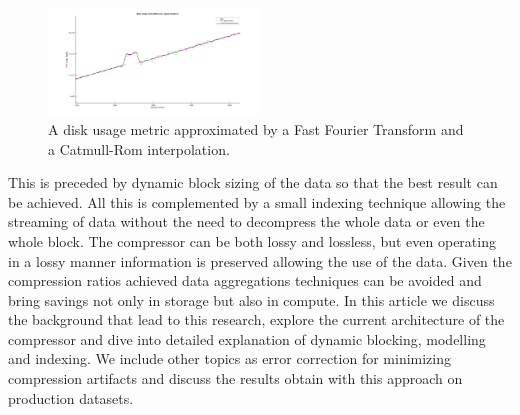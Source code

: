 \documentclass[conference]{IEEEtran}
\begin{document}
\begin{figure}[ht]
  \centering
  \includegraphics[width=0.5\textwidth]{math_approximation-2.png}
  \caption{A disk usage metric approximated by a Fast Fourier Transform and a Catmull-Rom interpolation.}
  \label{math_aprox}
\end{figure}

This is preceded by dynamic block sizing of the data so that the best result can be achieved.
All this is complemented by a small indexing technique allowing the streaming of data without the need to decompress the whole data or even the whole block.
The compressor can be both lossy and lossless, but even operating in a lossy manner information is preserved allowing the use of the data.
Given the compression ratios achieved data aggregations techniques can be avoided and bring savings not only in storage but also in compute.
In this article we discuss the background that lead to this research, explore the current architecture of the compressor and dive into detailed explanation of dynamic blocking, modelling and indexing.
We include other topics as error correction for minimizing compression artifacts and discuss the results obtain with this approach on production datasets.
\end{document}
